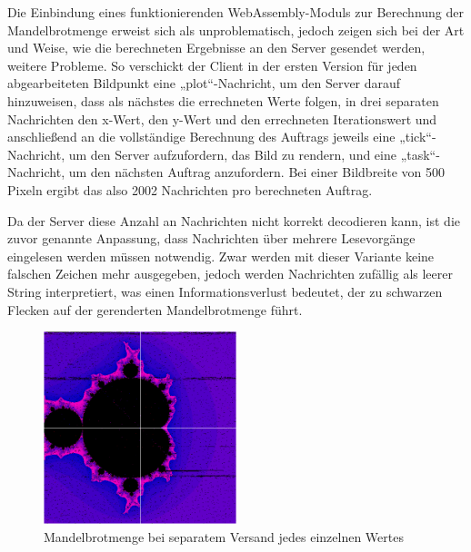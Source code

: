 \documentclass[12pt, onecolumn,notitlepage]{scrartcl}
\begin{document}
Die Einbindung eines funktionierenden WebAssembly-Moduls zur Berechnung der Mandelbrotmenge erweist sich als unproblematisch, jedoch zeigen sich bei der Art und Weise, wie die berechneten Ergebnisse an den Server gesendet werden, weitere Probleme. So verschickt der Client in der ersten Version für jeden abgearbeiteten Bildpunkt eine „plot“-Nachricht, um den Server darauf hinzuweisen, dass als nächstes die errechneten Werte folgen, in drei separaten Nachrichten den x-Wert, den y-Wert und den errechneten Iterationswert und anschließend an die vollständige Berechnung des Auftrags jeweils eine „tick“-Nachricht, um den Server aufzufordern, das Bild zu rendern, und eine „task“-Nachricht, um den nächsten Auftrag anzufordern. Bei einer Bildbreite von 500 Pixeln ergibt das also 2002 Nachrichten pro berechneten Auftrag. \par

Da der Server diese Anzahl an Nachrichten nicht korrekt decodieren kann, ist die zuvor genannte Anpassung, dass Nachrichten über mehrere Lesevorgänge eingelesen werden müssen notwendig. Zwar werden mit dieser Variante keine falschen Zeichen mehr ausgegeben, jedoch werden Nachrichten zufällig als leerer String interpretiert, was einen Informationsverlust bedeutet, der zu schwarzen Flecken auf der gerenderten Mandelbrotmenge führt. \par

\begin{figure}[htbp] 
	\centering
	\includegraphics[width=0.5\textwidth]{einzelnVersandt.PNG}
	\caption{Mandelbrotmenge bei separatem Versand jedes einzelnen Wertes}
	\label{fig:Bild1}
\end{figure}
\end{document}
